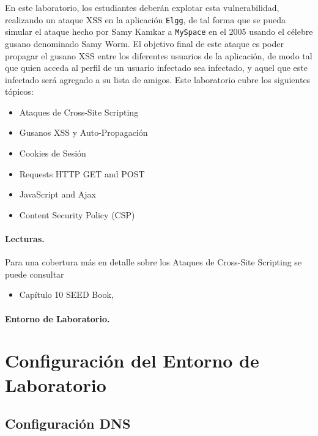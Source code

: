En este laboratorio, los estudiantes deberán explotar esta vulnerabilidad, realizando un ataque XSS en la aplicación {\tt Elgg}, de tal forma que se pueda simular el ataque hecho por Samy Kamkar a {\tt MySpace} en el 2005 usando el célebre gusano denominado Samy Worm.
El objetivo final de este ataque es poder propagar el gusano XSS entre los diferentes usuarios de la aplicación, de modo tal que quien acceda al perfil de un usuario infectado sea infectado, y aquel que este infectado será agregado a su lista de amigos. Este laboratorio cubre los siguientes tópicos:

\begin{itemize}[noitemsep]
 \item Ataques de Cross-Site Scripting
 \item Gusanos XSS y Auto-Propagación
 \item Cookies de Sesión
 \item Requests HTTP GET and POST
 \item JavaScript and Ajax
 \item Content Security Policy (CSP) 
\end{itemize}


\paragraph{Lecturas.}
Para una cobertura más en detalle sobre los Ataques de Cross-Site Scripting se puede consultar 
\begin{itemize}
\item Capítulo 10 SEED Book, \seedbook
\end{itemize}


\paragraph{Entorno de Laboratorio.} 
\seedenvironmentB  
\nodependency


\section{Configuración del Entorno de Laboratorio}


\subsection{Configuración DNS} 

